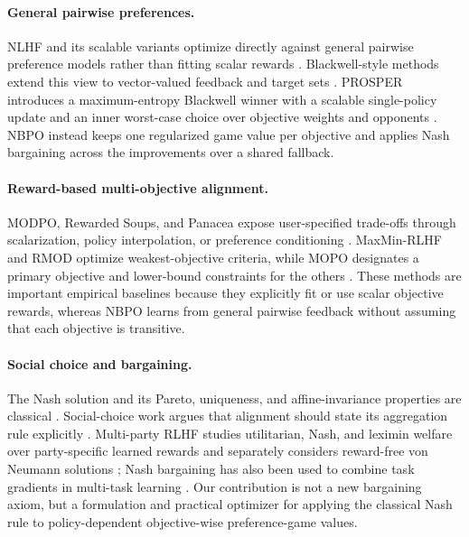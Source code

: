 \documentclass{article}
\theoremstyle{remark}
\theoremstyle{plain}
\newcommand{\NBPO}{\textsc{NBPO}}
\begin{document}
\paragraph{General pairwise preferences.}
NLHF and its scalable variants optimize directly against general pairwise preference models rather than fitting scalar rewards \citep{munos2024nash,wu2025sppo,zhang2025iterative,calandriello2024online,rosset2024direct,zhou2025egpo}. Blackwell-style methods extend this view to vector-valued feedback and target sets \citep{blackwell1956analog,bhatia2020multicriteria}. PROSPER introduces a maximum-entropy Blackwell winner with a scalable single-policy update and an inner worst-case choice over objective weights and opponents \citep{zhang2026prosper}. \NBPO{} instead keeps one regularized game value per objective and applies Nash bargaining across the improvements over a shared fallback.

\paragraph{Reward-based multi-objective alignment.}
MODPO, Rewarded Soups, and Panacea expose user-specified trade-offs through scalarization, policy interpolation, or preference conditioning \citep{zhou2024beyond,rame2023rewarded,zhong2024panacea}. MaxMin-RLHF and RMOD optimize weakest-objective criteria, while MOPO designates a primary objective and lower-bound constraints for the others \citep{chakraborty2024maxmin,son2026rmod,agnihotri2026mopo}. These methods are important empirical baselines because they explicitly fit or use scalar objective rewards, whereas \NBPO{} learns from general pairwise feedback without assuming that each objective is transitive.

\paragraph{Social choice and bargaining.}
The Nash solution and its Pareto, uniqueness, and affine-invariance properties are classical \citep{nash1950}. Social-choice work argues that alignment should state its aggregation rule explicitly \citep{conitzer2024social}. Multi-party RLHF studies utilitarian, Nash, and leximin welfare over party-specific learned rewards and separately considers reward-free von Neumann solutions \citep{zhong2024nashwelfare}; Nash bargaining has also been used to combine task gradients in multi-task learning \citep{navon2022nashmtl}. Our contribution is not a new bargaining axiom, but a formulation and practical optimizer for applying the classical Nash rule to policy-dependent objective-wise preference-game values.
\end{document}
